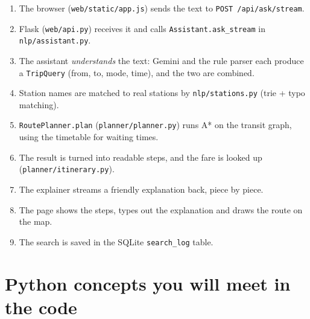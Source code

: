 \documentclass[11pt,a4paper]{article}
\newcommand{\file}[1]{\texttt{\color{accent}#1}}
\begin{document}
\begin{enumerate}
  \item The browser (\file{web/static/app.js}) sends the text to \texttt{POST /api/ask/stream}.
  \item Flask (\file{web/api.py}) receives it and calls \texttt{Assistant.ask\_stream} in \file{nlp/assistant.py}.
  \item The assistant \emph{understands} the text: Gemini and the rule parser each produce a
        \texttt{TripQuery} (from, to, mode, time), and the two are combined.
  \item Station names are matched to real stations by \file{nlp/stations.py} (trie + typo matching).
  \item \texttt{RoutePlanner.plan} (\file{planner/planner.py}) runs A* on the transit graph,
        using the timetable for waiting times.
  \item The result is turned into readable steps, and the fare is looked up
        (\file{planner/itinerary.py}).
  \item The explainer streams a friendly explanation back, piece by piece.
  \item The page shows the steps, types out the explanation and draws the route on the map.
  \item The search is saved in the SQLite \texttt{search\_log} table.
\end{enumerate}

\section{Python concepts you will meet in the code}
\end{document}
